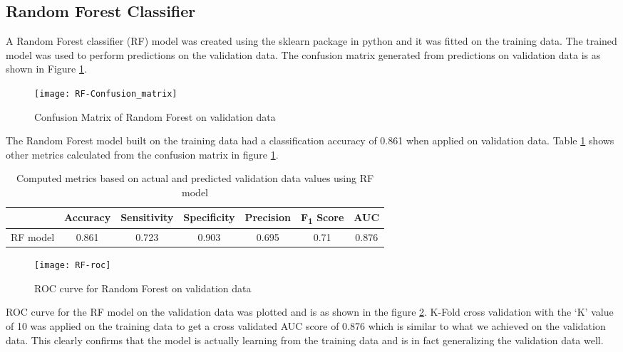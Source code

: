 \documentclass[11pt,openright]{report}
\begin{document}
\subsection {Random Forest Classifier}
A Random Forest classifier (RF) model was created using the sklearn package in python and it was fitted on the training data. The trained model was used to perform predictions on the validation data. The confusion matrix generated from predictions on validation data is as shown in Figure \ref{fig:RF_confusion_matrix}.

  \begin{figure}[!htb]
	\centering
	\texttt{[image: RF-Confusion\_matrix]}
	\caption{Confusion Matrix of Random Forest on validation data}
	\label{fig:RF_confusion_matrix}
\end{figure} 

The Random Forest model built on the training data had a classification accuracy of 0.861 when applied on validation data. Table \ref{table:RF_confusion_matrix} shows other metrics calculated from the confusion matrix in figure \ref{fig:RF_confusion_matrix}. 
\begin{table}[!htb]
	\renewcommand{\arraystretch}{1.3}
	\caption{Computed metrics based on actual and predicted validation data values using RF model}
	\label{table:RF_confusion_matrix}
	\centering
	\begin{tabular}{|c|c|c|c|c|c|c|}
    \hline
  	 & \bfseries Accuracy & \bfseries Sensitivity & \bfseries Specificity & \bfseries Precision & \bfseries F\textsubscript{1} Score  & \bfseries AUC\\  
    \hline
	RF model & 0.861 & 0.723 & 0.903 & 0.695 & 0.71 & 0.876 \\ \hline
	\end{tabular} 
\end{table}

 \begin{figure}[!htb]
	\centering
	\texttt{[image: RF-roc]}
	\caption{ROC curve for Random Forest on validation data}
	\label{fig:RF_roc}
\end{figure} 

ROC curve for the RF model on the validation data was plotted and is as shown in the figure \ref{fig:RF_roc}. K-Fold cross validation with the `K' value of 10 was applied on the training data to get a cross validated AUC score of 0.876 which is similar to what we achieved on the validation data. This clearly confirms that the model is actually learning from the training data and is in fact generalizing the validation data well.
\end{document}
